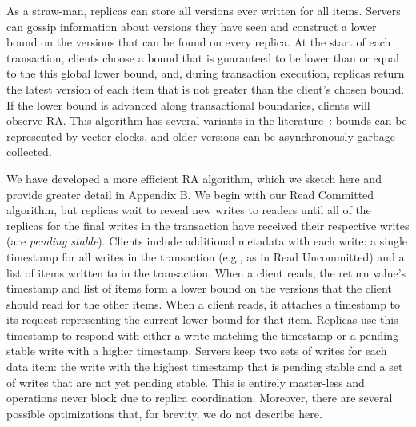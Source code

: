 
As a straw-man, replicas can store all versions ever written for all
items. Servers can gossip information about versions they have seen
and construct a lower bound on the versions that can be found on every
replica. At the start of each transaction, clients choose a bound that
is guaranteed to be lower than or equal to the this global lower
bound, and, during transaction execution, replicas return the latest
version of each item that is not greater than the client's chosen
bound. If the lower bound is advanced along transactional boundaries,
clients will observe RA. This algorithm has several variants in the
literature~\cite{readonly, swift}: bounds can be represented by vector
clocks, and older versions can be asynchronously garbage collected.

We have developed a more efficient RA algorithm, which we sketch here
and provide greater detail in Appendix B. We begin with our Read
Committed algorithm, but replicas wait to reveal new writes to readers
until all of the replicas for the final writes in the transaction have
received their respective writes (are \textit{pending
  stable}). Clients include additional metadata with each write: a
single timestamp for all writes in the transaction (e.g., as in Read
Uncommitted) and a list of items written to in the transaction. When a
client reads, the return value's timestamp and list of items form a
lower bound on the versions that the client should read for the other
items. When a client reads, it attaches a timestamp to its request
representing the current lower bound for that item. Replicas use this
timestamp to respond with either a write matching the timestamp or a
pending stable write with a higher timestamp. Servers keep two sets of
writes for each data item: the write with the highest timestamp that
is pending stable and a set of writes that are not yet pending
stable. This is entirely master-less and operations never block due to
replica coordination. Moreover, there are several possible
optimizations that, for brevity, we do not describe here.

